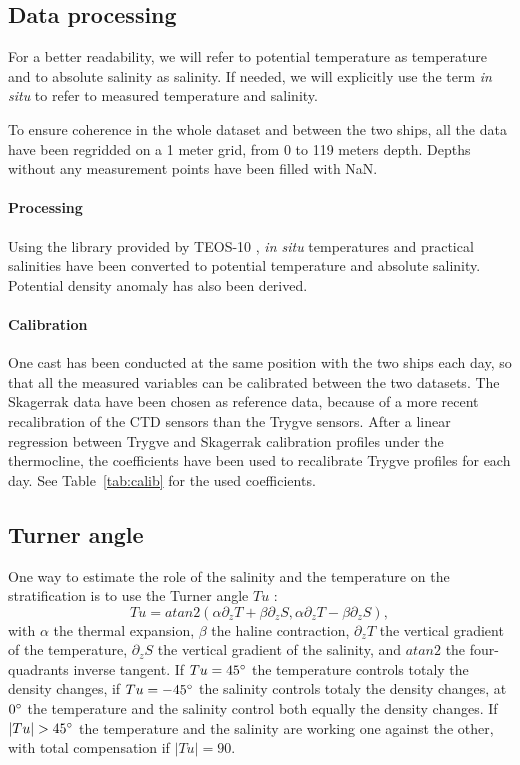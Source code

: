 \documentclass[12pt,a4paper]{article}
\begin{document}
\subsection{Data processing}
For a better readability, we will refer to potential temperature as temperature
and to absolute salinity as salinity.
If needed, we will explicitly use the term {\it in situ} to refer to
measured temperature and salinity.

To ensure coherence in the whole dataset and between the two ships,
all the data have been regridded on a 1 meter grid, from 0 to 119 meters depth.
Depths without any measurement points have been filled with NaN.

\paragraph{Processing}
Using the library provided by TEOS-10 \citep{gsw}, {\it in situ} temperatures and practical
salinities have been converted to potential temperature and absolute salinity.
Potential density anomaly has also been derived.

\paragraph{Calibration}
One cast has been conducted at the same position with the two ships each day,
so that all the measured variables can be calibrated between the two datasets.
The Skagerrak data have been chosen as reference data, because of a more
recent recalibration of the CTD sensors than the Trygve sensors.
After a linear regression between Trygve and Skagerrak calibration profiles
under the thermocline, the coefficients have been used to recalibrate
Trygve profiles for each day.
See Table~\ref{tab:calib} for the used coefficients.


\subsection{Turner angle}
One way to estimate the role of the salinity and the temperature on the stratification
is to use the Turner angle $Tu$ \citep{ruddick1983, johnson2012}:
\[Tu = atan2(\alpha \partial_z T + \beta \partial_z S,
\alpha \partial_z T - \beta \partial_z S),\]
with $\alpha$ the thermal expansion, $\beta$ the haline contraction,
$\partial_z T$ the vertical gradient of the temperature,
$\partial_z S$ the vertical gradient of the salinity,
and $atan2$ the four-quadrants inverse tangent.
If $Tu = 45^{\circ}$ the temperature controls totaly the density changes,
if $Tu = -45^{\circ}$ the salinity controls totaly the density changes,
at $0 ^{\circ}$ the temperature and the salinity control both equally
the density changes.
If $|Tu| > 45^{\circ}$ the temperature and the salinity are working
one against the other, with total compensation if $|Tu| = 90$.
\end{document}
